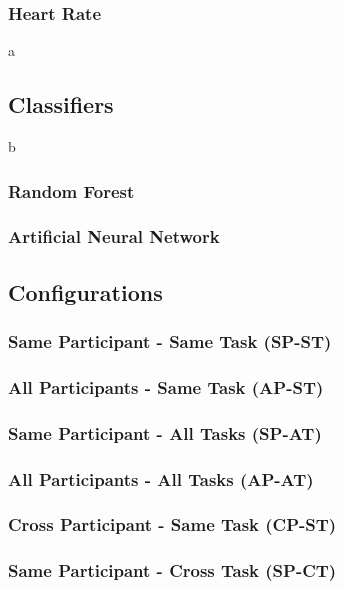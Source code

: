 \documentclass[11pt]{article}
\begin{document}
		\subsubsection{Heart Rate}
a			
	\subsection{Classifiers}
b
		\subsubsection{Random Forest}
		\subsubsection{Artificial Neural Network}
		
	\subsection{Configurations}
		\subsubsection{Same Participant - Same Task (SP-ST)}
		\subsubsection{All Participants - Same Task (AP-ST)}
		\subsubsection{Same Participant - All Tasks (SP-AT)}
		\subsubsection{All Participants - All Tasks (AP-AT)}
		\subsubsection{Cross Participant - Same Task (CP-ST)}
		\subsubsection{Same Participant - Cross Task (SP-CT)}
\end{document}
